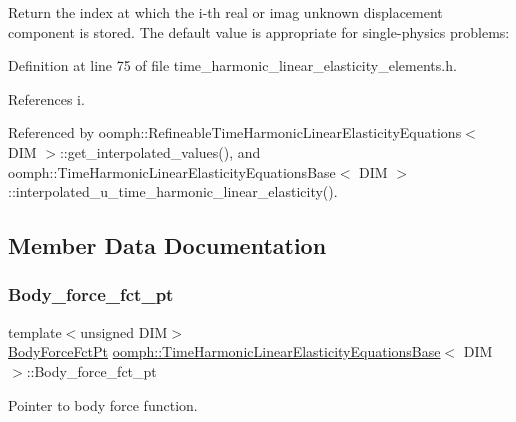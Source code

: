 Return the index at which the i-\/th real or imag unknown displacement component is stored. The default value is appropriate for single-\/physics problems\+: 



Definition at line 75 of file time\+\_\+harmonic\+\_\+linear\+\_\+elasticity\+\_\+elements.\+h.



References i.



Referenced by oomph\+::\+Refineable\+Time\+Harmonic\+Linear\+Elasticity\+Equations$<$ D\+I\+M $>$\+::get\+\_\+interpolated\+\_\+values(), and oomph\+::\+Time\+Harmonic\+Linear\+Elasticity\+Equations\+Base$<$ D\+I\+M $>$\+::interpolated\+\_\+u\+\_\+time\+\_\+harmonic\+\_\+linear\+\_\+elasticity().



\subsection{Member Data Documentation}
\mbox{\label{classoomph_1_1TimeHarmonicLinearElasticityEquationsBase_a9d956cbcc0fbc643a344e206df08c3fe}} 
\subsubsection{\texorpdfstring{Body\+\_\+force\+\_\+fct\+\_\+pt}{Body\_force\_fct\_pt}}
{\footnotesize\ttfamily template$<$unsigned D\+IM$>$ \\
\hyperlink{classoomph_1_1TimeHarmonicLinearElasticityEquationsBase_a8cff2941bd4dc9fd3714c151cf5b6e33}{Body\+Force\+Fct\+Pt} \hyperlink{classoomph_1_1TimeHarmonicLinearElasticityEquationsBase}{oomph\+::\+Time\+Harmonic\+Linear\+Elasticity\+Equations\+Base}$<$ D\+IM $>$\+::Body\+\_\+force\+\_\+fct\+\_\+pt\hspace{0.3cm}{\ttfamily [protected]}}



Pointer to body force function. 



